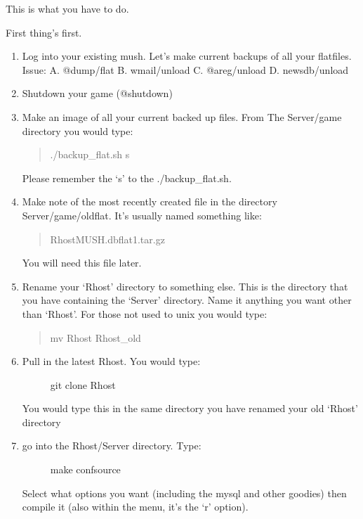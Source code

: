 \documentclass[letterpaper,10pt,english]{sphinxmanual}
\begin{document}
\sphinxAtStartPar
This is what you have to do.

\sphinxAtStartPar
First thing’s first.
\begin{enumerate}
%
\item {} 
\sphinxAtStartPar
Log into your existing mush.  Let’s make current backups
of all your flatfiles.  Issue:
A. @dump/flat
B. wmail/unload
C. @areg/unload
D. newsdb/unload

\item {} 
\sphinxAtStartPar
Shutdown your game (@shutdown)

\item {} 
\sphinxAtStartPar
Make an image of all your current backed up files.  From
The Server/game directory you would type:
\begin{quote}

\sphinxAtStartPar
./backup\_flat.sh \sphinxhyphen{}s
\end{quote}

\sphinxAtStartPar
Please remember the ‘\sphinxhyphen{}s’ to the ./backup\_flat.sh.

\item {} 
\sphinxAtStartPar
Make note of the most recently created file in the directory
Server/game/oldflat.  It’s usually named something like:
\begin{quote}

\sphinxAtStartPar
RhostMUSH.dbflat1.tar.gz
\end{quote}

\sphinxAtStartPar
You will need this file later.

\item {} 
\sphinxAtStartPar
Rename your ‘Rhost’ directory to something else.  This
is the directory that you have containing the ‘Server’
directory.  Name it anything you want other than ‘Rhost’.
For those not used to unix you would type:
\begin{quote}

\sphinxAtStartPar
mv Rhost Rhost\_old
\end{quote}

\item {} \begin{description}
\item[{Pull in the latest Rhost.  You would type:}] \leavevmode
\sphinxAtStartPar
git clone  Rhost

\end{description}

\sphinxAtStartPar
You would type this in the same directory you have renamed
your old ‘Rhost’ directory

\item {} \begin{description}
\item[{go into the Rhost/Server directory.   Type:}] \leavevmode
\sphinxAtStartPar
make confsource

\end{description}

\sphinxAtStartPar
Select what options you want (including the mysql and other goodies)
then compile it (also within the menu, it’s the ‘r’ option).

\end{enumerate}
\end{document}
